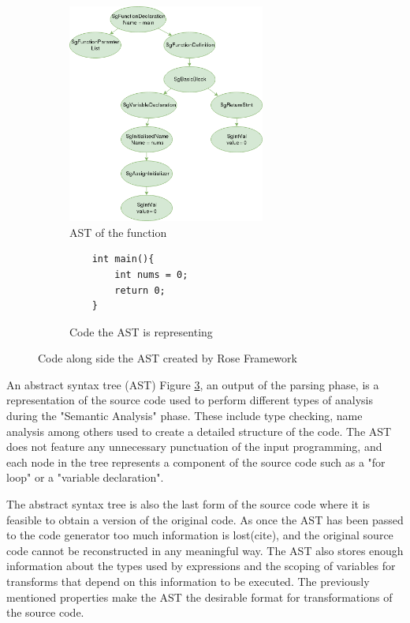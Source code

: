 \documentclass[bsc,frontabs,singlespacing,twoside,parskip,deptreport]{infthesis}
\begin{document}
\begin{figure}[H]
    \begin{subfigure}[b]{0.5\textwidth}
        \centering
        \includegraphics[height=7.2cm]{images/ast-example.png}
        \caption{AST of the function}
        \label{fig:ast-example-AST}
    \end{subfigure}
    \hfill
    \begin{subfigure}[b]{0.5\textwidth}
        \centering
        \begin{verbatim}
    int main(){
        int nums = 0;
        return 0;
    }
        \end{verbatim}
        \caption{Code the AST is representing}
        \label{fig:ast-example-code}
    \end{subfigure}
    \vspace{-0.5cm}
    \caption{Code along side the AST created by Rose Framework }
    \label{fig:ast-example}
\end{figure}

An abstract syntax tree (AST) Figure \ref{fig:ast-example}, an output of the parsing phase, is a representation of the source code used to perform different types of analysis during the "Semantic Analysis" phase. These include type checking, name analysis among others used to create a detailed structure of the code. The AST does not feature any unnecessary punctuation of the input programming, and each node in the tree represents a component of the source code such as a "for loop" or a "variable declaration".


The abstract syntax tree is also the last form of the source code where it is feasible to obtain a version of the original code. As once the AST has been passed to the code generator too much information is lost(cite), and the original source code cannot be reconstructed in any meaningful way. The AST also stores enough information about the types used by expressions and the scoping of variables for transforms that depend on this information to be executed. The previously mentioned properties make the AST the desirable format for transformations of the source code. 
\end{document}
